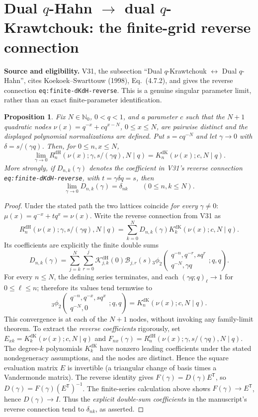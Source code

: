 \documentclass[11pt]{article}
\newtheorem{proposition}{Proposition}
\begin{document}
\section{Dual $q$-Hahn $\longrightarrow$ dual $q$-Krawtchouk: the finite-grid reverse connection}
\noindent\textbf{Source and eligibility.} V31, the subsection
``Dual $q$-Krawtchouk $\leftrightarrow$ Dual $q$-Hahn'', cites
Koekoek--Swarttouw (1998), Eq.~(4.7.2), and gives the reverse
connection \texttt{eq:finite-dKdH-reverse}. This is a genuine singular
parameter limit, rather than an exact finite-parameter identification.
\begin{proposition}
Fix $N\in\mathbb N_0$, $0<q<1$, and a parameter $c$ such that the
$N+1$ quadratic nodes $\nu(x)=q^{-x}+cq^{x-N}$, $0\le x\le N$,
are pairwise distinct and the displayed polynomial normalizations
are defined. Put $s=cq^{-N}$ and let $\gamma\to0$ with
$\delta=s/(\gamma q)$. Then, for $0\le n,x\le N$,
\[
\boxed{\lim_{\gamma\to0}
R_n^{\mathrm{dH}}(\nu(x);\gamma,s/(\gamma q),N\mid q)
=K_n^{\mathrm{dK}}(\nu(x);c,N\mid q).}
\]
More strongly, if $D_{n,k}(\gamma)$ denotes the coefficient in V31's
\emph{reverse} connection \texttt{eq:finite-dKdH-reverse}, with
$t=\gamma\delta q=s$, then
\[
\boxed{\lim_{\gamma\to0}D_{n,k}(\gamma)=\delta_{nk}}
\qquad(0\le n,k\le N).
\]
\end{proposition}
\begin{proof}
Under the stated path the two lattices coincide \emph{for every}
$\gamma\ne0$: $\mu(x)=q^{-x}+tq^x=\nu(x)$. Write the reverse
connection from V31 as
\[
R_n^{\mathrm{dH}}(\nu(x);\gamma,s/(\gamma q),N\mid q)
=\sum_{k=0}^{N}D_{n,k}(\gamma)
K_k^{\mathrm{dK}}(\nu(x);c,N\mid q).
\]
Its coefficients are explicitly the finite double sums
\[
D_{n,k}(\gamma)=\sum_{j=k}^{N}\sum_{r=0}^{j}
\mathscr K^{\mathrm{dH}}_{j,k}(0)\mathscr B_{j,r}(s)
{}_3\phi_2\!\left(\begin{matrix}q^{-n},q^{-r},sq^r\\
q^{-N},\gamma q\end{matrix};q,q\right).
\]
For every $n\le N$, the defining series terminates, and each
$(\gamma q;q)_\ell\to1$ for $0\le\ell\le n$; therefore its
values tend termwise to
\[
{}_3\phi_2\!\left(\begin{matrix}q^{-n},q^{-x},sq^x\\
q^{-N},0\end{matrix};q,q\right)
=K_n^{\mathrm{dK}}(\nu(x);c,N\mid q).
\]
This convergence is at each of the $N+1$ nodes, without invoking
any family-limit theorem. To extract the \emph{reverse coefficients}
rigorously, set $E_{xk}=K_k^{\mathrm{dK}}(\nu(x);c,N\mid q)$ and
$F_{nx}(\gamma)=R_n^{\mathrm{dH}}(\nu(x);\gamma,s/(\gamma q),N\mid q)$.
The degree-$k$ polynomials $K_k^{\mathrm{dK}}$ have nonzero leading
coefficients under the stated nondegeneracy assumptions, and the
nodes are distinct. Hence the square evaluation matrix $E$ is
invertible (a triangular change of basis times a Vandermonde matrix).
The reverse identity gives $F(\gamma)=D(\gamma)E^{\mathsf T}$,
so $D(\gamma)=F(\gamma)(E^{\mathsf T})^{-1}$. The finite-series
calculation above shows $F(\gamma)\to E^{\mathsf T}$, hence
$D(\gamma)\to I$.
Thus the \emph{explicit double-sum coefficients} in the manuscript's
reverse connection tend to $\delta_{nk}$, as asserted.
\end{proof}
\end{document}
